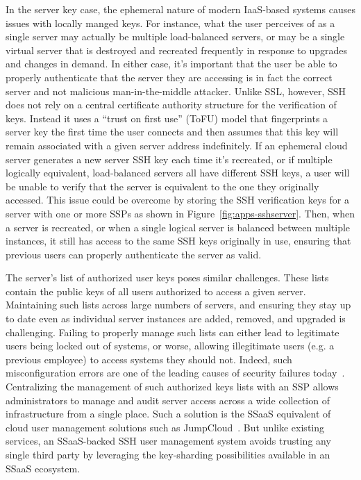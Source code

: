 In the server key case, the ephemeral nature of modern IaaS-based
systems causes issues with locally manged keys. For instance, what the
user perceives of as a single server may actually be multiple
load-balanced servers, or may be a single virtual server that is
destroyed and recreated frequently in response to upgrades and changes
in demand. In either case, it's important that the user be able to
properly authenticate that the server they are accessing is in fact
the correct server and not malicious man-in-the-middle
attacker. Unlike SSL, however, SSH does not rely on a central
certificate authority structure for the verification of keys. Instead
it uses a ``trust on first use'' (ToFU) model that fingerprints a
server key the first time the user connects and then assumes that this
key will remain associated with a given server address
indefinitely. If an ephemeral cloud server generates a new server SSH
key each time it's recreated, or if multiple logically equivalent,
load-balanced servers all have different SSH keys, a user will be
unable to verify that the server is equivalent to the one they
originally accessed. This issue could be overcome by storing the SSH
verification keys for a server with one or more SSPs as shown in
Figure~\ref{fig:apps-sshserver}. Then, when a server is recreated, or
when a single logical server is balanced between multiple instances,
it still has access to the same SSH keys originally in use, ensuring
that previous users can properly authenticate the server as valid.

The server's list of authorized user keys poses similar
challenges. These lists contain the public keys of all users
authorized to access a given server. Maintaining such lists across
large numbers of servers, and ensuring they stay up to date even as
individual server instances are added, removed, and upgraded is
challenging. Failing to properly manage such lists can either lead to
legitimate users being locked out of systems, or worse, allowing
illegitimate users (e.g. a previous employee) to access systems they
should not. Indeed, such misconfiguration errors are one of the
leading causes of security failures today~\cite{bishop1996,
  kerravala2002}. Centralizing the management of such authorized keys
lists with an SSP allows administrators to manage and audit server
access across a wide collection of infrastructure from a single
place. Such a solution is the SSaaS equivalent of cloud user
management solutions such as JumpCloud~\cite{jumpcloud}. But unlike
existing services, an SSaaS-backed SSH user management system avoids
trusting any single third party by leveraging the key-sharding
possibilities available in an SSaaS ecosystem.

